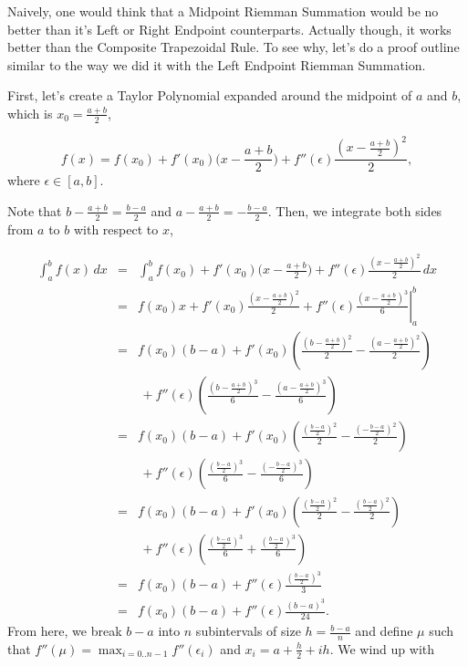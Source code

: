 \documentclass[12pt]{article}
\newcommand{\newLine}{\vspace{5mm}}
\newcommand{\integral}[3]{\text{$\int^{#2}_{#1} #3\,dx$}}
\begin{document}
Naively, one would think that a Midpoint Riemman Summation would be no better than it's Left or Right Endpoint counterparts. Actually though, it works better than the Composite Trapezoidal Rule. To see why, let's do a proof outline similar to the way we did it with the Left Endpoint Riemman Summation.

First, let's create a Taylor Polynomial expanded around the midpoint of $a$ and $b$, which is $x_0=\frac{a+b}{2}$,

\begin{equation*} f(x) = f(x_0) + f'(x_0)\Big(x - \frac{a+b}{2}\Big) + f''(\epsilon)\frac{(x - \frac{a+b}{2})^2}{2},\end{equation*}
where $\epsilon\in[a,b]$.

\newLine\noindent Note that $b - \frac{a+b}{2}=\frac{b-a}{2}$ and $a - \frac{a+b}{2}=-\frac{b-a}{2}$. Then, we integrate both sides from $a$ to $b$ with respect to $x$,

\begin{eqnarray*} \integral{a}{b}{f(x)} &=& \integral{a}{b}{f(x_0) + f'(x_0)\Big(x - \frac{a+b}{2}\Big) + f''(\epsilon)\frac{(x - \frac{a+b}{2})^2}{2}} \\
&=& \left.f(x_0)x + f'(x_0)\frac{(x - \frac{a+b}{2})^2}{2} + f''(\epsilon)\frac{(x - \frac{a+b}{2})^3}{6}\right|_a^b \\
&=& f(x_0)(b-a) + f'(x_0)\left(\frac{(b - \frac{a+b}{2})^2}{2} -\frac{(a - \frac{a+b}{2})^2}{2}\right) \\
& &\, + f''(\epsilon)\left(\frac{(b - \frac{a+b}{2})^3}{6} - \frac{(a - \frac{a+b}{2})^3}{6} \right) \\
&=& f(x_0)(b-a) + f'(x_0)\left(\frac{(\frac{b-a}{2})^2}{2} -\frac{(-\frac{b-a}{2})^2}{2}\right) \\
& &\, + f''(\epsilon)\left(\frac{(\frac{b-a}{2})^3}{6} - \frac{(-\frac{b-a}{2})^3}{6} \right) \\
&=& f(x_0)(b-a) + f'(x_0)\left(\frac{(\frac{b-a}{2})^2}{2} -\frac{(\frac{b-a}{2})^2}{2}\right) \\
& &\, + f''(\epsilon)\left(\frac{(\frac{b-a}{2})^3}{6} + \frac{(\frac{b-a}{2})^3}{6} \right) \\
&=& f(x_0)(b-a) + f''(\epsilon)\frac{(\frac{b-a}{2})^3}{3}  \\
&=& f(x_0)(b-a) + f''(\epsilon)\frac{(b-a)^3}{24}.
\end{eqnarray*}
From here, we break $b-a$ into $n$ subintervals of size $h=\frac{b-a}{n}$ and define $\mu$ such that $f''(\mu) = \displaystyle\max_{i=0..n-1}f''(\epsilon_i)$  and $x_i = a + \frac{h}{2} + ih$. We wind up with
\end{document}
